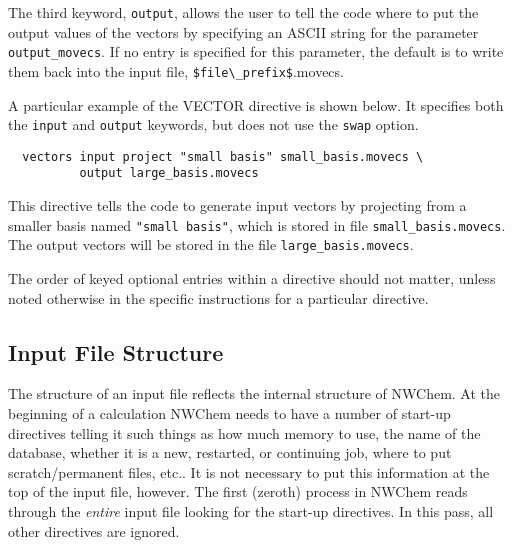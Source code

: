 The third keyword, \verb+output+, allows the user to tell the code where
to put the output values of the vectors by specifying an ASCII string
for the parameter {\tt output\_movecs}.  If no entry is specified for
this parameter, the default is to write them
back into the input file, \verb+$file\_prefix$+.movecs.


A particular example of the VECTOR directive is shown below.  It specifies
both the \verb+input+ and \verb+output+ keywords, but does not use the 
\verb+swap+ option.

\begin{verbatim}
  vectors input project "small basis" small_basis.movecs \
          output large_basis.movecs
\end{verbatim}

This directive tells the code to generate input vectors by projecting from a 
smaller basis named \verb+"small basis"+, which is stored in file 
\verb+small_basis.movecs+.  The output vectors will be stored in the file
 \verb+large_basis.movecs+.

The order of keyed optional entries within a directive should not matter,
unless noted otherwise in the specific instructions for a particular directive.


\subsection{Input File Structure}
\label{sec:inputstructure}

The structure of an input file reflects the internal structure of
NWChem.  At the beginning of a calculation NWChem needs to have a number
of start-up directives telling it such things as how much memory to use, 
the name of the database, whether it is a new, restarted, or continuing job, 
where to put scratch/permanent files, etc..  It is not necessary to put
this information at the top of the input file, however.  The first (zeroth)
process in NWChem reads through the {\em entire} input file looking for 
the start-up directives.  In this pass, all other directives are ignored.  

